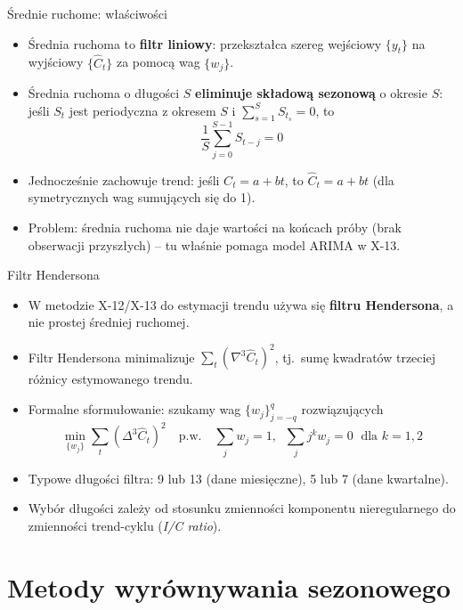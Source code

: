 \documentclass[11pt,usenames,dvipsnames,aspectratio=169]{beamer}
\begin{document}
\begin{frame}{Średnie ruchome: właściwości}
\begin{itemize}
    \item Średnia ruchoma to \textbf{filtr liniowy}: przekształca szereg wejściowy $\{y_t\}$ na wyjściowy $\{\hat{C}_t\}$ za pomocą wag $\{w_j\}$.
    \item Średnia ruchoma o długości $S$ \textbf{eliminuje składową sezonową} o okresie $S$: jeśli $S_t$ jest periodyczna z okresem $S$ i $\sum_{s=1}^S S_{t_s} = 0$, to
    \[
    \frac{1}{S}\sum_{j=0}^{S-1} S_{t-j} = 0
    \]
    \item Jednocześnie zachowuje trend: jeśli $C_t = a + bt$, to $\hat{C}_t = a + bt$ (dla symetrycznych wag sumujących się do 1).
    \item Problem: średnia ruchoma nie daje wartości na końcach próby (brak obserwacji przyszłych) -- tu właśnie pomaga model ARIMA w X-13.
\end{itemize}
\end{frame}

\begin{frame}{Filtr Hendersona}
\begin{itemize}
    \item W metodzie X-12/X-13 do estymacji trendu używa się \textbf{filtru Hendersona}, a nie prostej średniej ruchomej.
    \item Filtr Hendersona minimalizuje $\sum_{t}\!\left(\nabla^{3}\hat{C}_{t}\right)^{2}$, tj.\ sumę kwadratów trzeciej różnicy estymowanego trendu.
    \item Formalne sformułowanie: szukamy wag $\{w_j\}_{j=-q}^{q}$ rozwiązujących
    \[
    \min_{\{w_j\}} \sum_t \left(\Delta^3 \hat{C}_t\right)^2 \quad \text{p.w.} \quad \sum_j w_j = 1,\;\; \sum_j j^k w_j = 0 \;\text{ dla } k=1,2
    \]
    \item Typowe długości filtra: 9 lub 13 (dane miesięczne), 5 lub 7 (dane kwartalne).
    \item Wybór długości zależy od stosunku zmienności komponentu nieregularnego do zmienności trend-cyklu (\emph{I/C ratio}).
\end{itemize}
\end{frame}

\section{Metody wyrównywania sezonowego}
\end{document}

